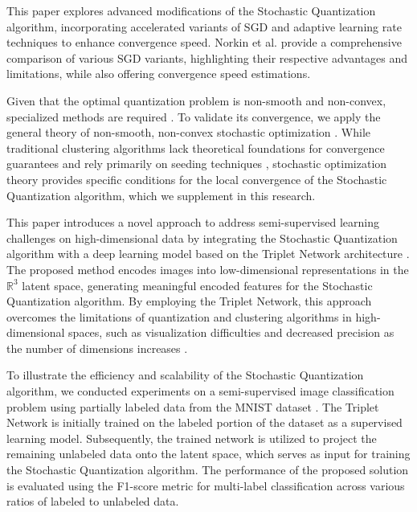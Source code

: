 This paper explores advanced modifications of the Stochastic Quantization algorithm, incorporating accelerated variants of SGD \cite{nesterov1983method,Poliak_1987,walkington_2023} and adaptive learning rate techniques \cite{Duchi_Hazan_Singer_2011,kingma2017adam,tieleman2012rmsprop} to enhance convergence speed. Norkin et al. \cite{Norkin_Kozyriev_Norkin_2024} provide a comprehensive comparison of various SGD variants, highlighting their respective advantages and limitations, while also offering convergence speed estimations.

Given that the optimal quantization problem is non-smooth and non-convex, specialized methods are required \cite{Gandikota_Kane_Maity_Mazumdar_2022,Tang_2017,Zhao_Lan_Chen_Ngo_2021}. To validate its convergence, we apply the general theory of non-smooth, non-convex stochastic optimization \cite{Ermoliev_Norkin_2003,Ermolev_Norkin_1998,mikhalevich2024}. While traditional clustering algorithms lack theoretical foundations for convergence guarantees and rely primarily on seeding techniques \cite{Arthur_Vassilvitskii_2007}, stochastic optimization theory provides specific conditions for the local convergence of the Stochastic Quantization algorithm, which we supplement in this research.

This paper introduces a novel approach to address semi-supervised learning challenges on high-dimensional data by integrating the Stochastic Quantization algorithm with a deep learning model based on the Triplet Network architecture \cite{Hoffer_2015}. The proposed method encodes images into low-dimensional representations in the $\mathbb{R}^3$ latent space, generating meaningful encoded features for the Stochastic Quantization algorithm. By employing the Triplet Network, this approach overcomes the limitations of quantization and clustering algorithms in high-dimensional spaces, such as visualization difficulties and decreased precision as the number of dimensions increases \cite{Kriegel_Kröger_Zimek_2009}.

To illustrate the efficiency and scalability of the Stochastic Quantization algorithm, we conducted experiments on a semi-supervised image classification problem using partially labeled data from the MNIST dataset \cite{lecun2010mnist}. The Triplet Network is initially trained on the labeled portion of the dataset as a supervised learning model. Subsequently, the trained network is utilized to project the remaining unlabeled data onto the latent space, which serves as input for training the Stochastic Quantization algorithm. The performance of the proposed solution is evaluated using the F1-score metric \cite{Chinchor_1992} for multi-label classification across various ratios of labeled to unlabeled data.
